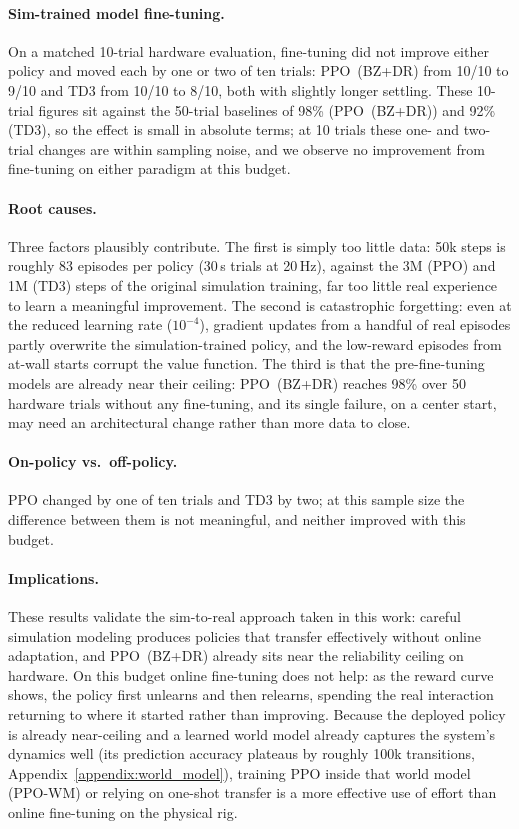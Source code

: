 \paragraph{Sim-trained model fine-tuning.}
On a matched 10-trial hardware evaluation, fine-tuning did not improve either
policy and moved each by one or two of ten trials: PPO~(BZ+DR) from 10/10 to
9/10 and TD3 from 10/10 to 8/10, both with slightly longer settling. These 10-trial
figures sit against the 50-trial baselines of 98\% (PPO~(BZ+DR))
and 92\% (TD3), so the effect is small in absolute terms; at 10 trials these
one- and two-trial changes are within sampling noise, and we observe no
improvement from fine-tuning on either paradigm at this budget.

\paragraph{Root causes.}
Three factors plausibly contribute. The first is simply too little data: 50k
steps is roughly 83 episodes per policy (30\,s trials at 20\,Hz), against the
3M (PPO) and 1M (TD3) steps of the original simulation training, far too little
real experience to learn a meaningful improvement. The second is catastrophic
forgetting: even at the reduced learning rate ($10^{-4}$), gradient updates
from a handful of real episodes partly overwrite the simulation-trained
policy, and the low-reward episodes from at-wall starts corrupt the value
function. The third is that the pre-fine-tuning models are already near their
ceiling: PPO~(BZ+DR) reaches 98\% over 50 hardware trials without any
fine-tuning, and its single failure, on a center start, may need an
architectural change rather than more data to close.

\paragraph{On-policy vs.\ off-policy.}
PPO changed by one of ten trials and TD3 by two; at this sample size the
difference between them is not meaningful, and neither improved with this
budget.

\paragraph{Implications.}
These results validate the sim-to-real approach taken in this work:
careful simulation modeling produces policies that transfer effectively
without online adaptation, and PPO~(BZ+DR) already sits near the
reliability ceiling on hardware. On this budget online fine-tuning does
not help: as the reward curve shows, the policy first unlearns and then
relearns, spending the real interaction returning to where it started
rather than improving. Because the deployed policy is already
near-ceiling and a learned world model already captures the system's
dynamics well (its prediction accuracy plateaus by roughly 100k
transitions, Appendix~\ref{appendix:world_model}), training PPO inside
that world model (PPO-WM) or relying on one-shot transfer is a more
effective use of effort than online fine-tuning on the physical rig.


